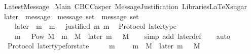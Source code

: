 %
\begin{isabellebody}%
%
%
\isadelimdocument
%
\endisadelimdocument
%
\isatagdocument
%
\isamarkuptrue%
%
\endisatagdocument
{\isafolddocument}%
%
\isadelimdocument
%
\endisadelimdocument
%
\isadelimtheory
%
\endisadelimtheory
%
\isatagtheory
{}\isamarkupfalse%
\ LatestMessage\isanewline
\isanewline
{}\ Main\ CBCCasper\ MessageJustification\ {\isachardoublequoteopen}Libraries{\isacharslash}LaTeXsugar{\isachardoublequoteclose}\isanewline
\isanewline
{}%
\endisatagtheory
{\isafoldtheory}%
%
\isadelimtheory
\isanewline
%
\endisadelimtheory
\isanewline
\isanewline
\isanewline
\isanewline
\isanewline
\isanewline
\isanewline
\isanewline
\isanewline
{}\isamarkupfalse%
\ later\ {\isacharcolon}{\isacharcolon}\ {\isachardoublequoteopen}{\isacharparenleft}message\ {\isacharasterisk}\ message\ set{\isacharparenright}\ {\isasymRightarrow}\ message\ set{\isachardoublequoteclose}\isanewline
\ \ \isanewline
\ \ \ \ {\isachardoublequoteopen}later\ {\isacharequal}\ {\isacharparenleft}{\isasymlambda}{\isacharparenleft}m{\isacharcomma}\ {\isasymsigma}{\isacharparenright}{\isachardot}\ {\isacharbraceleft}m{\isacharprime}\ {\isasymin}\ {\isasymsigma}{\isachardot}\ justified\ m\ m{\isacharprime}{\isacharbraceright}{\isacharparenright}{\isachardoublequoteclose}\isanewline
\isanewline
{}\isamarkupfalse%
\ {\isacharparenleft}\ Protocol{\isacharparenright}\ later{\isacharunderscore}type\ {\isacharcolon}\isanewline
\ \ {\isachardoublequoteopen}{\isasymforall}\ {\isasymsigma}\ m{\isachardot}\ {\isasymsigma}\ {\isasymin}\ Pow\ M\ {\isasymand}\ m\ {\isasymin}\ M\ {\isasymlongrightarrow}\ later\ {\isacharparenleft}m{\isacharcomma}\ {\isasymsigma}{\isacharparenright}\ {\isasymsubseteq}\ M{\isachardoublequoteclose}\isanewline
%
\isadelimproof
\ \ %
\endisadelimproof
%
\isatagproof
{}\isamarkupfalse%
\ {\isacharparenleft}simp\ add{\isacharcolon}\ later{\isacharunderscore}def{\isacharparenright}\isanewline
\ \ \isamarkupfalse%
\ auto%
\endisatagproof
{\isafoldproof}%
%
\isadelimproof
\isanewline
%
\endisadelimproof
\isanewline
{}\isamarkupfalse%
\ {\isacharparenleft}\ Protocol{\isacharparenright}\ later{\isacharunderscore}type{\isacharunderscore}for{\isacharunderscore}state\ {\isacharcolon}\isanewline
\ \ {\isachardoublequoteopen}{\isasymforall}\ {\isasymsigma}\ m{\isachardot}\ {\isasymsigma}\ {\isasymin}\ {\isasymSigma}\ {\isasymand}\ m\ {\isasymin}\ M\ {\isasymlongrightarrow}\ later\ {\isacharparenleft}m{\isacharcomma}\ {\isasymsigma}{\isacharparenright}\ {\isasymsubseteq}\ M{\isachardoublequoteclose}\isanewline

\end{isabellebody}
